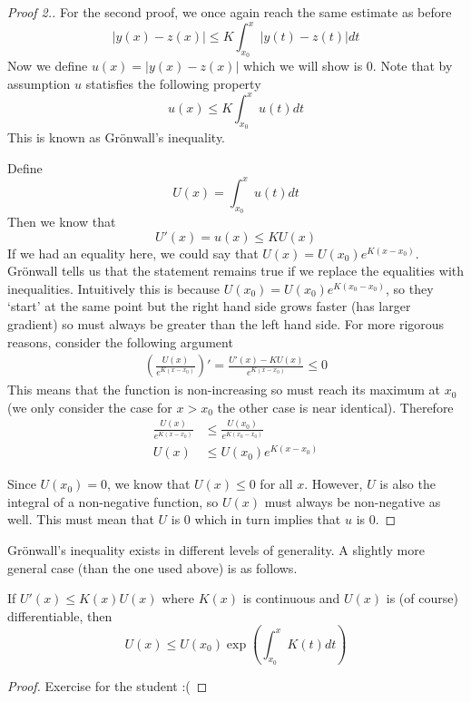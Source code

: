 \begin{proof}[Proof 2.]
    For the second proof, we once again reach the same estimate as before
    $$ |y(x) - z(x)| \leq K \int_{x_0}^{x} |y(t) - z(t)| dt $$
    Now we define $u(x) = |y(x) - z(x)|$ which we will show is 0. Note that by assumption $u$ statisfies the following property
    $$ u(x) \leq K \int_{x_0}^{x} u(t)dt $$
    This is known as Grönwall's inequality.
    
    Define 
    $$ U(x) = \int_{x_0}^{x} u(t) dt $$
    Then we know that
    $$ U'(x) = u(x) \leq KU(x)$$
    If we had an equality here, we could say that $U(x) = U(x_0) e^{K(x - x_0)}$. Grönwall tells us that the statement remains true if we replace the equalities with inequalities. Intuitively this is because $U(x_0) = U(x_0)e^{K(x_0 - x_0)}$, so they `start' at the same point but the right hand side grows faster (has larger gradient) so must always be greater than the left hand side. For more rigorous reasons, consider the following argument
\begin{align*}
    \left( \frac{U(x)}{e^{K(x - x_0)}} \right)' = \frac{U'(x) - K U(x)}{e^{K(x - x_0)}} \leq 0
\end{align*}
    This means that the function is non-increasing so must reach its maximum at $x_0$ (we only consider the case for $x > x_0$ the other case is near identical). Therefore
    \begin{align*}
        \frac{U(x)}{e^{K(x - x_0)}} &\leq \frac{U(x_0)}{e^{K(x_0 - x_0)}}\\
        U(x) &\leq U(x_0) e^{K(x - x_0)}
    \end{align*}
    
    Since $U(x_0) = 0$, we know that $U(x) \leq 0$ for all $x$. However, $U$ is also the integral of a non-negative function, so $U(x)$ must always be non-negative as well. This must mean that $U$ is 0 which in turn implies that $u$ is 0.
\end{proof}

Grönwall's inequality exists in different levels of generality. A slightly more general case (than the one used above) is as follows.
\begin{theorem}
If $U'(x) \leq K(x) U(x)$ where $K(x)$ is continuous and $U(x)$ is (of course) differentiable, then
$$ U(x) \leq U(x_0) \exp \left( \int_{x_0}^{x} K(t) dt \right) $$
\end{theorem}
\begin{proof}
    Exercise for the student :(
\end{proof}

